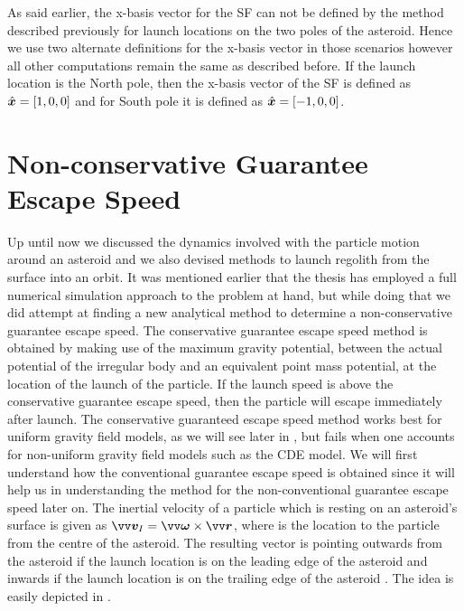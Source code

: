 \FloatBarrier
As said earlier, the x-basis vector for the \gls{SF} can not be defined by the method described previously for launch locations on the two poles of the asteroid. Hence we use two alternate definitions for the x-basis vector in those scenarios however all other computations remain the same as described before. If the launch location is the North pole, then the x-basis vector of the \gls{SF} is defined as $\hat{\bm{x}}=[1, 0, 0]$ and for South pole it is defined as $\hat{\bm{x}}=[-1, 0, 0]$.

\section{Non-conservative Guarantee Escape Speed}
\label{sec:escape_speed_derivation}
Up until now we discussed the dynamics involved with the particle motion around an asteroid and we also devised methods to launch regolith from the surface into an orbit. It was mentioned earlier that the thesis has employed a full numerical simulation approach to the problem at hand, but while doing that we did attempt at finding a new analytical method to determine a non-conservative guarantee escape speed.
%
\newline\newline
%
The conservative guarantee escape speed method is obtained by making use of the maximum gravity potential, between the actual potential of the irregular body and an equivalent point mass potential, at the location of the launch of the particle. If the launch speed is above the conservative guarantee escape speed, then the particle will escape immediately after launch. The conservative guaranteed escape speed method works best for uniform gravity field models, as we will see later in , but fails when one accounts for non-uniform gravity field models such as the \gls{CDE} model.
%
\newline\newline
%
We will first understand how the conventional guarantee escape speed is obtained since it will help us in understanding the method for the non-conventional guarantee escape speed later on. The inertial velocity of a particle which is resting on an asteroid's surface is given as $\bv{v}_I = \bv{\omega} \times \bv{r}$, where  is the location to the particle from the centre of the asteroid. The resulting vector is pointing outwards from the asteroid if the launch location is on the leading edge of the asteroid and inwards if the launch location is on the trailing edge of the asteroid \parencite{scheeresBook}. The idea is easily depicted in .
